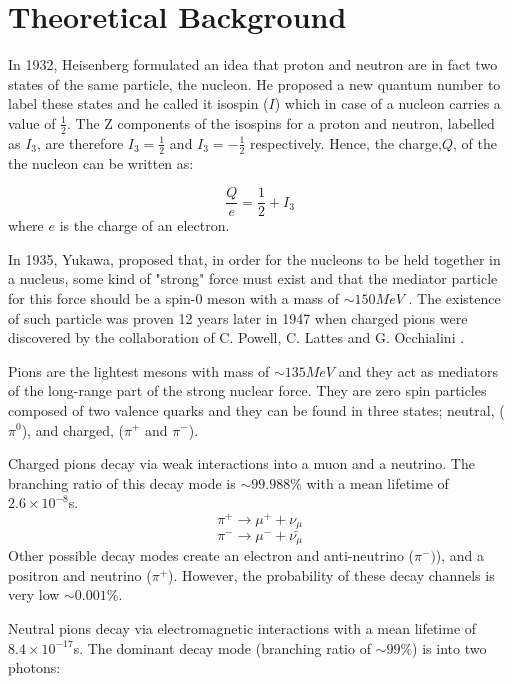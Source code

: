 \chapter{Theoretical Background}

\indent In 1932, Heisenberg formulated an idea that proton and neutron are in fact two states of the same particle, the nucleon. He proposed a new quantum number to label these states and he called it isospin ($I$) which in case of a nucleon carries a value of $\frac{1}{2}$. The Z components of the  isospins for a proton and neutron, labelled as $I_{3}$, are therefore $I_{3}=\frac{1}{2}$ and $I_{3}=-\frac{1}{2}$ respectively. Hence, the charge,$Q$, of the the nucleon can be written as:

\begin{equation}
\frac{Q}{e}=\frac{1}{2}+I_{3}
\end{equation}
where $e$ is the charge of an electron.

\indent In 1935, Yukawa, proposed that, in order for the nucleons to be held together in a nucleus, some kind of "strong" force must exist and that the mediator particle for this force should be a spin-0 meson with a mass of $\sim150MeV$ \cite{dudek}. The existence of such particle was proven 12 years later in 1947 when charged pions were discovered by the collaboration of C. Powell, C. Lattes and G. Occhialini \cite{martin}.

\indent Pions are the lightest mesons with mass of $\sim135MeV$ and they act as mediators of the long-range part of the strong nuclear force. They are zero spin particles composed of two valence quarks and they can be found in three states; neutral, ($\pi^{0}$), and charged, ($\pi^{+}$ and $\pi^{-}$).

\indent Charged pions decay via weak interactions into a muon and a neutrino. The branching ratio of this decay mode is $\sim99.988\%$ with a mean lifetime of $2.6 \times 10^{-8}$s.
\begin{equation}
\pi^{+} \rightarrow \mu^{+} + \nu_{\mu}
\end{equation}
\begin{equation}
\pi^{-} \rightarrow \mu^{-} + \bar{\nu_{\mu}}
\end{equation}
Other possible decay modes create an electron and anti-neutrino ($\pi^{-})$), and a positron and neutrino ($\pi^{+}$). However, the probability of these decay channels is very low $\sim0.001\%$.

\indent Neutral pions decay via electromagnetic interactions with a mean lifetime of $8.4 \times 10^{-17}$s. The dominant decay mode (branching ratio of $\sim99\%$) is into two photons:

